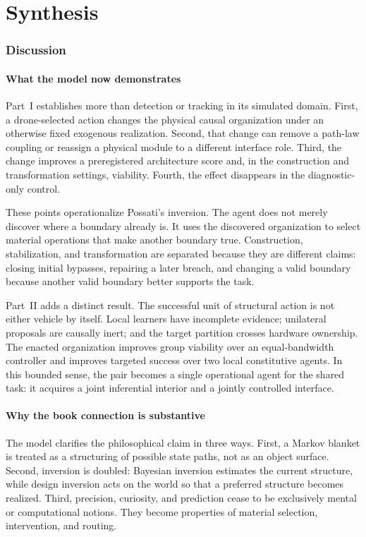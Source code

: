 \documentclass[11pt,a4paper]{article}
\numberwithin{equation}{section}
\begin{document}
\FloatBarrier

\part{Synthesis}
\section{Discussion}

\subsection{What the model now demonstrates}

Part~I establishes more than detection or tracking in its simulated domain.
First, a drone-selected action changes the physical causal organization under
an otherwise fixed exogenous realization. Second, that change can remove a
path-law coupling or reassign a physical module to a different interface
role. Third, the change improves a preregistered architecture score and, in
the construction and transformation settings, viability. Fourth, the effect
disappears in the diagnostic-only control.

These points operationalize Possati's inversion. The agent does not merely
discover where a boundary already is. It uses the discovered organization to
select material operations that make another boundary true. Construction,
stabilization, and transformation are separated because they are different
claims: closing initial bypasses, repairing a later breach, and changing a
valid boundary because another valid boundary better supports the task.

Part~II adds a distinct result. The successful unit of structural action is
not either vehicle by itself. Local learners have incomplete evidence;
unilateral proposals are causally inert; and the target partition crosses
hardware ownership. The enacted organization improves group viability over
an equal-bandwidth controller and improves targeted success over two local
constitutive agents. In this bounded sense, the pair becomes a single
operational agent for the shared task: it acquires a joint inferential
interior and a jointly controlled interface.

\subsection{Why the book connection is substantive}

The model clarifies the philosophical claim in three ways. First, a Markov
blanket is treated as a structuring of possible state paths, not as an object
surface. Second, inversion is doubled: Bayesian inversion estimates the
current structure, while design inversion acts on the world so that a
preferred structure becomes realized. Third, precision, curiosity, and
prediction cease to be exclusively mental or computational notions. They
become properties of material selection, intervention, and routing.
\end{document}
